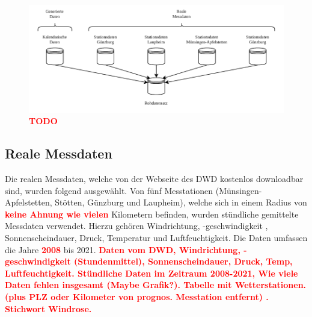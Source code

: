 \documentclass[
12pt, %
toc=listofnumbered, %
toc=chapterentrydotfill, %
numbers=noenddot, %
captions=tableheading, %
]{scrreprt}
\let\Oldsubsection\subsection
\renewcommand{\subsection}{\FloatBarrier\Oldsubsection}
\newcommand{\highlight}[1]{\textbf{\textcolor{red}{#1}}}
\begin{document}
\begin{figure}[tph]
	\begin{center}
		\includegraphics[]{./images/rohdatensatz.pdf}
		\caption{\highlight{{TODO}}}
		\label{fig:rohdatensatz}
	\end{center}
\end{figure}

\subsection{Reale Messdaten}
Die realen Messdaten, welche von der Webseite des DWD kostenlos downloadbar sind, wurden folgend ausgewählt.
Von fünf Messtationen (Münsingen-Apfelstetten, Stötten, Günzburg und Laupheim), welche sich in einem Radius von 
\highlight{keine Ahnung wie vielen} Kilometern befinden, wurden stündliche gemittelte Messdaten verwendet. Hierzu gehören Windrichtung, -geschwindigkeit , Sonnenscheindauer, Druck, Temperatur und Luftfeuchtigkeit. 
Die Daten umfassen die Jahre \highlight{2008} bis 2021.
\highlight{Daten vom DWD, Windrichtung, -geschwindigkeit (Stundenmittel), Sonnenscheindauer, Druck, Temp, Luftfeuchtigkeit. 
Stündliche Daten im Zeitraum 2008-2021, Wie viele Daten fehlen insgesamt (Maybe Grafik?). 
Tabelle mit Wetterstationen. (plus PLZ oder Kilometer von prognos. Messtation entfernt) . 
Stichwort Windrose.}
\end{document}

